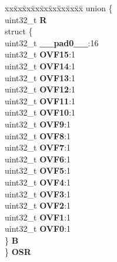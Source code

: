 \begin{DoxyCompactItemize}
\begin{tabbing}
\end{tabbing}\item 
\mbox{\label{structSIU__tag_a08722d0928a6c8898d9c7444392ddc5d}} 
\begin{tabbing}
xx\=xx\=xx\=xx\=xx\=xx\=xx\=xx\=xx\=\kill
union \{\\
\>uint32\_t {\bfseries R}\\
\>struct \{\\
\>\>uint32\_t {\bfseries \_\_pad0\_\_}:16\\
\>\>uint32\_t {\bfseries OVF15}:1\\
\>\>uint32\_t {\bfseries OVF14}:1\\
\>\>uint32\_t {\bfseries OVF13}:1\\
\>\>uint32\_t {\bfseries OVF12}:1\\
\>\>uint32\_t {\bfseries OVF11}:1\\
\>\>uint32\_t {\bfseries OVF10}:1\\
\>\>uint32\_t {\bfseries OVF9}:1\\
\>\>uint32\_t {\bfseries OVF8}:1\\
\>\>uint32\_t {\bfseries OVF7}:1\\
\>\>uint32\_t {\bfseries OVF6}:1\\
\>\>uint32\_t {\bfseries OVF5}:1\\
\>\>uint32\_t {\bfseries OVF4}:1\\
\>\>uint32\_t {\bfseries OVF3}:1\\
\>\>uint32\_t {\bfseries OVF2}:1\\
\>\>uint32\_t {\bfseries OVF1}:1\\
\>\>uint32\_t {\bfseries OVF0}:1\\
\>\} {\bfseries B}\\
\} {\bfseries OSR}\\


\end{tabbing}
\end{DoxyCompactItemize}

